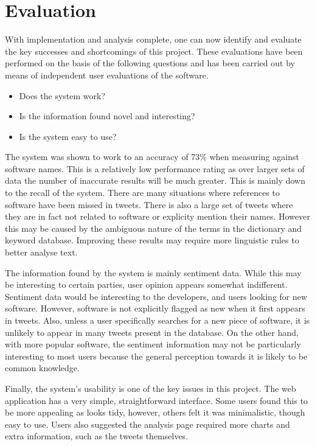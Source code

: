 \chapter{Evaluation}
\label{cha:eval}
With implementation and analysis complete, one can now identify and evaluate the key successes and shortcomings of this project. These evaluations have been performed on the basis of the following questions and has been carried out by means of independent user evaluations of the software.

\begin{itemize}
\item Does the system work?
\item Is the information found novel and interesting?
\item Is the system easy to use?
\end{itemize}

The system was shown to work to an accuracy of 73\% when measuring against software names. This is a relatively low performance rating as over larger sets of data the number of inaccurate results will be much greater. This is mainly down to the recall of the system. There are many situations where references to software have been missed in tweets. There is also a large set of tweets where they are in fact not related to software or explicity mention their names. However this may be caused by the ambiguous nature of the terms in the dictionary and keyword database. Improving these results may require more linguistic rules to better analyse text.

The information found by the system is mainly sentiment data. While this may be interesting to certain parties, user opinion appears somewhat indifferent. Sentiment data would be interesting to the developers, and users looking for new software. However, software is not explicitly flagged as new when it first appears in tweets. Also, unless a user specifically searches for a new piece of software, it is unlikely to appear in many tweets present in the database. On the other hand, with more popular software, the sentiment information may not be particularly interesting to most users because the general perception towards it is likely to be common knowledge.

Finally, the system's usability is one of the key issues in this project. The web application has a very simple, straightforward interface. Some users found this to be more appealing as looks tidy, however, others felt it was minimalistic, though easy to use. Users also suggested the analysis page required more charts and extra information, such as the tweets themselves.


